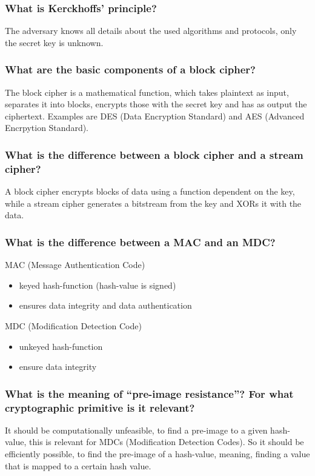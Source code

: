 \documentclass[a4paper, 10 pt, conference]{ieeeconf}
\begin{document}
\subsubsection{\textbf{What is Kerckhoffs' principle?}}
The adversary knows all details about the used algorithms and protocols, only the secret key is unknown. 

\subsubsection{\textbf{What are the basic components of a block cipher?}}
The block cipher is a mathematical function, which takes plaintext as input, separates it into blocks, encrypts those with the secret key and has as output the ciphertext. 
Examples are DES (Data Encryption Standard) and AES (Advanced Encrpytion Standard). 

\subsubsection{\textbf{What is the difference between a block cipher and a stream cipher?}}
A block cipher encrypts blocks of data using a function dependent on the key, while a stream cipher generates a bitstream from the key and XORs it with the data. 

\subsubsection{\textbf{What is the difference between a MAC and an MDC?}}
MAC (Message Authentication Code)
\begin{itemize}
\item keyed hash-function (hash-value is signed)
\item ensures data integrity and data authentication
\end{itemize}
MDC (Modification Detection Code)
\begin{itemize}
\item unkeyed hash-function
\item ensure data integrity
\end{itemize}

\subsubsection{\textbf{What is the meaning of ``pre-image resistance''? For what cryptographic primitive is it relevant?}}
It should be computationally unfeasible, to find a pre-image to a given hash-value, this is relevant for MDCs (Modification Detection Codes). 
So it should be efficiently possible, to find the pre-image of a hash-value, meaning, finding a value that is mapped to a certain hash value. 
\end{document}
